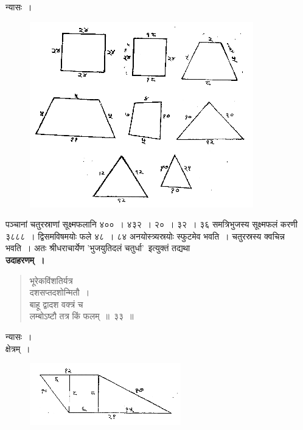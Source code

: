 \documentclass[11pt, openany]{book}
\begin{document}
 न्यासः~। 
\begin{figure}[h!]
    \centering
    \includegraphics[scale=0.8]{graphics/capture39.png}
\end{figure}
\newpage
 पञ्चानां चतुरस्राणां सूक्ष्मफलानि ४००~। ४३२~। २०~। ३२~। ३६ समत्रिभुजस्य सूक्ष्मफलं करणी ३८८८~। द्विसमविषमयोः फले ४८~। ८४
अनयोस्त्र्यस्रयोः स्फुटमेव भवति~। चतुरस्रस्य क्वचिन्न भवति~। 
अतः {\color{violet}श्रीधराचार्येण} '{\color{violet}भुजयुतिदलं चतुर्धा}'\textendash\ इत्युक्तं तद्यथा\textendash\\

\vspace{-2mm}
 \textbf{उदाहरणम्~।} 
\begin{quote}
    \bqt 
     भूरेकविंशतिर्यत्र \\
 दशसप्तदशोन्मितौ~। \\
 बाहू द्वादश वक्त्रं च \\
 लम्बोऽष्टौ तत्र किं फलम्~॥~३३~॥~
\end{quote}

 न्यासः~।  \\
 
 \vspace{-3mm}
क्षेत्रम्~।
 \vspace{-2mm}
\begin{figure}[h!]
    \centering
    \includegraphics[scale=0.8]{graphics/capture40.png}
\end{figure}
 \vspace{-2mm}
 
\end{document}
